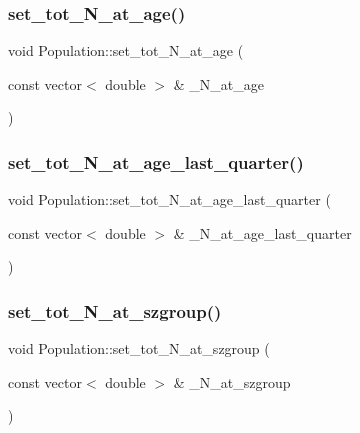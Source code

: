 \mbox{\label{class_population_a3444d96e560758bf888e3f571d5e22a2}} 
\subsubsection{\texorpdfstring{set\_tot\_N\_at\_age()}{set\_tot\_N\_at\_age()}}
{\footnotesize\ttfamily void Population\+::set\+\_\+tot\+\_\+\+N\+\_\+at\+\_\+age (\begin{DoxyParamCaption}\item[{const vector$<$ double $>$ \&}]{\+\_\+\+N\+\_\+at\+\_\+age }\end{DoxyParamCaption})}

\mbox{\label{class_population_aff05fe4dc6b58ef517e5515a91cb369d}} 
\subsubsection{\texorpdfstring{set\_tot\_N\_at\_age\_last\_quarter()}{set\_tot\_N\_at\_age\_last\_quarter()}}
{\footnotesize\ttfamily void Population\+::set\+\_\+tot\+\_\+\+N\+\_\+at\+\_\+age\+\_\+last\+\_\+quarter (\begin{DoxyParamCaption}\item[{const vector$<$ double $>$ \&}]{\+\_\+\+N\+\_\+at\+\_\+age\+\_\+last\+\_\+quarter }\end{DoxyParamCaption})}

\mbox{\label{class_population_ab2b125b67c0162045ef57d4a852a334c}} 
\subsubsection{\texorpdfstring{set\_tot\_N\_at\_szgroup()}{set\_tot\_N\_at\_szgroup()}}
{\footnotesize\ttfamily void Population\+::set\+\_\+tot\+\_\+\+N\+\_\+at\+\_\+szgroup (\begin{DoxyParamCaption}\item[{const vector$<$ double $>$ \&}]{\+\_\+\+N\+\_\+at\+\_\+szgroup }\end{DoxyParamCaption})}

